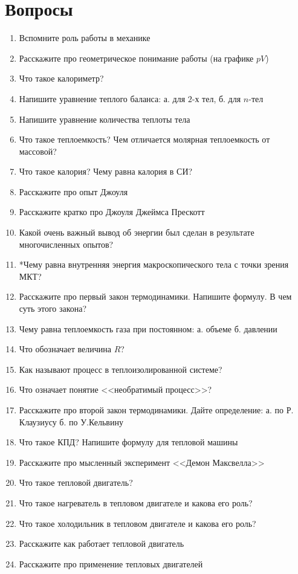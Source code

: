 \documentclass[12pt,a4paper]{report}
\begin{document}
\section{Вопросы}
\begin{enumerate}
\item Вспомните роль работы в механике
\item Расскажите про геометрическое понимание работы (на графике $pV$)
\item Что такое калориметр?
\item Напишите уравнение теплого баланса: а. для $2$-х тел, б. для $n$-тел 
\item Напишите уравнение количества теплоты тела
\item Что такое теплоемкость? Чем отличается молярная теплоемкость от массовой?
\item Что такое калория? Чему равна калория в СИ?
\item Расскажите про опыт Джоуля
\item Расскажите кратко про Джоуля Джеймса Прескотт
\item Какой очень важный вывод об энергии был сделан в результате многочисленных опытов?
\item *Чему равна внутренняя энергия макроскопического тела с точки зрения МКТ?
\item Расскажите про первый закон термодинамики. Напишите формулу. В чем суть этого закона?
\item Чему равна теплоемкость газа при постоянном: а. объеме б. давлении
\item Что обозначает величина $R$?
\item Как называют процесс в теплоизолированной системе?
\item Что означает понятие <<необратимый процесс>>?
\item Расскажите про второй закон термодинамики. Дайте определение: а. по Р. Клаузиусу б. по У.Кельвину 
\item Что такое КПД? Напишите формулу для тепловой машины
\item Расскажите про мысленный эксперимент <<Демон Максвелла>>
\item Что такое тепловой двигатель?
\item Что такое нагреватель в тепловом двигателе и какова его роль?
\item Что такое холодильник в тепловом двигателе и какова его роль?
\item Расскажите как работает тепловой двигатель
\item Расскажите про применение тепловых двигателей

\end{enumerate}
\end{document}
